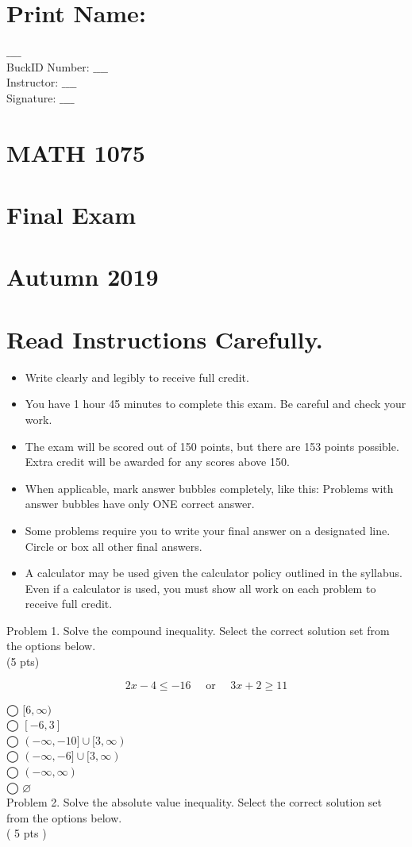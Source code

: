 \documentclass{ximera}
\author{Final Exam - Form A}
\date{}
\begin{document}
\section*{Print Name:}
$\_\_\_\_$\\
BuckID Number: $\_\_\_\_$\\
Instructor: $\_\_\_\_$\\
Signature: $\_\_\_\_$

\section*{MATH 1075}
\section*{Final Exam}
\section*{Autumn 2019}
\section*{Read Instructions Carefully.}
\begin{itemize}
  \item Write clearly and legibly to receive full credit.
  \item You have 1 hour 45 minutes to complete this exam. Be careful and check your work.
  \item The exam will be scored out of 150 points, but there are 153 points possible. Extra credit will be awarded for any scores above 150.
  \item When applicable, mark answer bubbles completely, like this: Problems with answer bubbles have only ONE correct answer.
  \item Some problems require you to write your final answer on a designated line. Circle or box all other final answers.
  \item A calculator may be used given the calculator policy outlined in the syllabus. Even if a calculator is used, you must show all work on each problem to receive full credit.
\end{itemize}

Problem 1. Solve the compound inequality. Select the correct solution set from the options below.\\
(5 pts)

$$2 x-4 \leq-16 \quad \text { or } \quad 3 x+2 \geq 11$$

◯ $[6, \infty)$\\
◯ $[-6,3]$\\
◯ $(-\infty,-10] \cup[3, \infty)$\\
◯ $(-\infty,-6] \cup[3, \infty)$\\
◯ $(-\infty, \infty)$\\
◯ $\varnothing$\\
Problem 2. Solve the absolute value inequality. Select the correct solution set from the options below.\\
( 5 pts )
\end{document}
